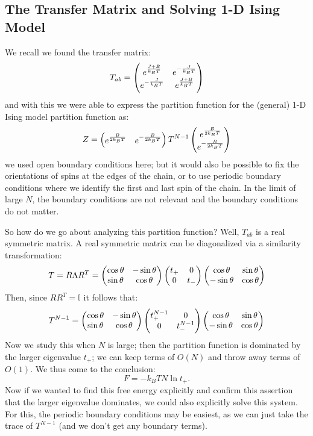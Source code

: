 \subsection{The Transfer Matrix and Solving 1-D Ising Model}
We recall we found the transfer matrix:
\begin{equation}
    T_{ab} = \begin{pmatrix}e^{\frac{J + B}{k_B T}} & e^{-\frac{J}{k_B T}} \\ e^{-\frac{J}{k_B T}} & e^{\frac{J + B}{k_B T}}\end{pmatrix}
\end{equation}
and with this we were able to express the partition function for the (general) 1-D Ising model partition function as:
\begin{equation}
    Z = \begin{pmatrix}e^{\frac{B}{2k_B T}} & e^{-\frac{B}{2k_B T}}\end{pmatrix} T^{N - 1}\begin{pmatrix}e^{\frac{B}{2k_B T}} \\ e^{-\frac{B}{2k_B T}}\end{pmatrix}
\end{equation}
we used open boundary conditions here; but it would also be possible to fix the orientations of spins at the edges of the chain, or to use periodic boundary conditions where we identify the first and last spin of the chain. In the limit of large $N$, the boundary conditions are not relevant and the boundary conditions do not matter.


So how do we go about analyzing this partition function? Well, $T_{ab}$ is a real symmetric matrix. A real symmetric matrix can be diagonalized via a similarity transformation:
\begin{equation}
    T = R\Lambda R^T = \begin{pmatrix}\cos\theta & -\sin\theta \\ \sin\theta & \cos\theta\end{pmatrix}\begin{pmatrix}t_+ & 0 \\ 0 & t_-\end{pmatrix}\begin{pmatrix}\cos\theta & \sin\theta \\ -\sin\theta & \cos\theta\end{pmatrix}
\end{equation}
Then, since $RR^T = \mathbb{I}$ it follows that:
\begin{equation}
    T^{N-1} =  \begin{pmatrix}\cos\theta & -\sin\theta \\ \sin\theta & \cos\theta\end{pmatrix}\begin{pmatrix}t_+^{N-1} & 0 \\ 0 & t_-^{N-1}\end{pmatrix}\begin{pmatrix}\cos\theta & \sin\theta \\ -\sin\theta & \cos\theta\end{pmatrix}
\end{equation}
Now we study this when $N$ is large; then the partition function is dominated by the larger eigenvalue $t_+$; we can keep terms of $O(N)$ and throw away terms of $O(1)$. We thus come to the conclusion:
\begin{equation}
    F = -k_B T N\ln t_+.
\end{equation}
Now if we wanted to find this free energy explicitly and confirm this assertion that the larger eigenvalue dominates, we could also explicitly solve this system. For this, the periodic boundary conditions may be easiest, as we can just take the trace of $T^{N-1}$ (and we don't get any boundary terms).

